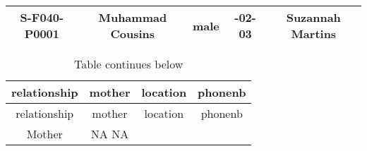 \documentclass[
]{article}
\begin{document}
\begin{longtable}[]{@{}ccccc@{}}
\begin{minipage}[t]{0.17\columnwidth}
S-F040-P0001\strut
\end{minipage} & \begin{minipage}[t]{0.23\columnwidth}\centering
Muhammad Cousins\strut
\end{minipage} & \begin{minipage}[t]{0.10\columnwidth}\centering
male\strut
\end{minipage} & \begin{minipage}[t]{0.15\columnwidth}\centering
2021-02-03\strut
\end{minipage} & \begin{minipage}[t]{0.21\columnwidth}\centering
Suzannah Martins\strut
\end{minipage}\tabularnewline
\bottomrule
\end{longtable}

\begin{longtable}[]{@{}cccc@{}}
\caption{Table continues below}\tabularnewline
\toprule
\begin{minipage}[b]{0.35\columnwidth}\centering
relationship\strut
\end{minipage} & \begin{minipage}[b]{0.18\columnwidth}\centering
mother\strut
\end{minipage} & \begin{minipage}[b]{0.18\columnwidth}\centering
location\strut
\end{minipage} & \begin{minipage}[b]{0.18\columnwidth}\centering
phonenb\strut
\end{minipage}\tabularnewline
\midrule
\endfirsthead
\toprule
\begin{minipage}[b]{0.35\columnwidth}\centering
relationship\strut
\end{minipage} & \begin{minipage}[b]{0.18\columnwidth}\centering
mother\strut
\end{minipage} & \begin{minipage}[b]{0.18\columnwidth}\centering
location\strut
\end{minipage} & \begin{minipage}[b]{0.18\columnwidth}\centering
phonenb\strut
\end{minipage}\tabularnewline
\midrule
\endhead
\begin{minipage}[t]{0.35\columnwidth}\centering
Mother\strut
\end{minipage} & \begin{minipage}[t]{0.18\columnwidth}\centering
NA NA\strut
\end{minipage} & \begin{minipage}[t]{0.18\columnwidth}\centering

\end{minipage}
\end{longtable}
\end{document}
